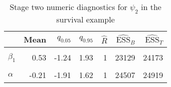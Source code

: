 \begin{table}

\caption{\label{tab:surv-stage-two-diag-psi-2}Stage two numeric diagnostics for $\psi_{2}$ in the survival example}
\centering
\begin{tabular}[t]{lrrrrrr}
\toprule
  & Mean & $q_{0.05}$ & $q_{0.95}$ & $\widehat{R}$ & $\widehat{\text{ESS}}_{B}$ & $\widehat{\text{ESS}}_{T}$\\
\midrule
\cellcolor{gray!6}{$\beta_{0}$} & \cellcolor{gray!6}{-0.28} & \cellcolor{gray!6}{-1.90} & \cellcolor{gray!6}{1.50} & \cellcolor{gray!6}{1} & \cellcolor{gray!6}{24823} & \cellcolor{gray!6}{24791}\\
$\beta_{1}$ & 0.53 & -1.24 & 1.93 & 1 & 23129 & 24173\\
\cellcolor{gray!6}{$\gamma$} & \cellcolor{gray!6}{1.62} & \cellcolor{gray!6}{0.44} & \cellcolor{gray!6}{5.23} & \cellcolor{gray!6}{1} & \cellcolor{gray!6}{20984} & \cellcolor{gray!6}{24286}\\
$\alpha$ & -0.21 & -1.91 & 1.62 & 1 & 24507 & 24919\\
\bottomrule
\end{tabular}
\end{table}
